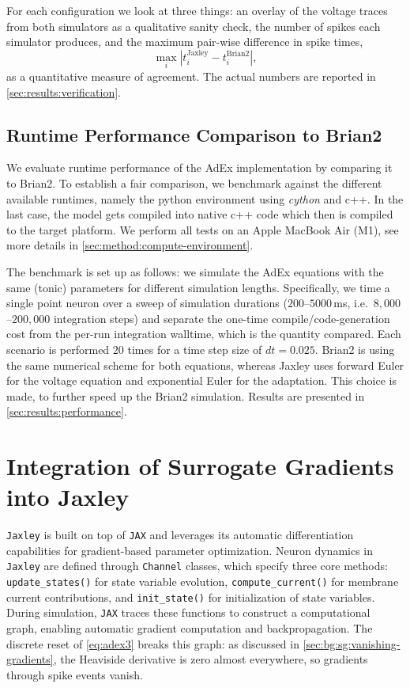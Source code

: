For each configuration we look at three things: an overlay of the voltage traces from both simulators as a qualitative sanity check, the number of spikes each simulator produces, and the maximum pair-wise difference in spike times,
$$\max_i |t_i^{\text{Jaxley}} - t_i^{\text{Brian2}}|,$$
as a quantitative measure of agreement.
The actual numbers are reported in \cref{sec:results:verification}.

\subsection{Runtime Performance Comparison to Brian2}\label{sec:method:adex:runtime}
We evaluate runtime performance of the AdEx implementation by comparing it to Brian2.
To establish a fair comparison, we benchmark against the different available runtimes, namely the python environment using \textit{cython} and c++.
In the last case, the model gets compiled into native c++ code which then is compiled to the target platform.
We perform all tests on an Apple MacBook Air (M1), see more details in \cref{sec:method:compute-environment}.

The benchmark is set up as follows:
we simulate the AdEx equations with the same (tonic) parameters for different simulation lengths.
Specifically, we time a single point neuron over a sweep of simulation durations ($200$--$5000$\,ms, i.e.\ $8{,}000$--$200{,}000$ integration steps)
and separate the one-time compile/code-generation cost from the per-run integration walltime, which is the quantity compared.
Each scenario is performed 20 times for a time step size of $dt = 0.025$.
Brian2 is using the same numerical scheme for both equations, whereas Jaxley uses forward Euler for the voltage equation and
exponential Euler for the adaptation.
This choice is made, to further speed up the Brian2 simulation.
Results are presented in \cref{sec:results:performance}.


\section{Integration of Surrogate Gradients into Jaxley}\label{sec:method:surrogate-gradients}
\texttt{Jaxley} is built on top of \texttt{JAX} and leverages its automatic differentiation capabilities for gradient-based parameter optimization.
Neuron dynamics in \texttt{Jaxley} are defined through \texttt{Channel} classes, which specify three core methods:
\texttt{update\_states()} for state variable evolution, \texttt{compute\_current()} for membrane current contributions, and \texttt{init\_state()} for initialization of state variables.
During simulation, \texttt{JAX} traces these functions to construct a computational graph, enabling automatic gradient computation and backpropagation.
The discrete reset of \cref{eq:adex3} breaks this graph: as discussed in \cref{sec:bg:sg:vanishing-gradients}, the Heaviside derivative is zero almost everywhere, so gradients through spike events vanish.

